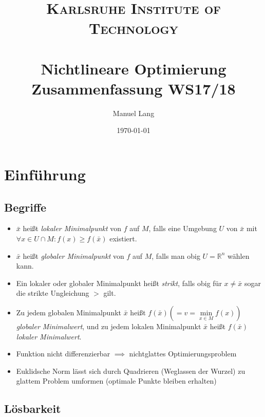 \documentclass[paper=a4, fontsize=11pt]{scrartcl} %
\title{
\normalfont \normalsize
\textsc{Karlsruhe Institute of Technology} \\ [25pt] %
\horrule{0.5pt} \\[0.4cm] %
\huge Nichtlineare Optimierung\\ Zusammenfassung WS17/18 %
\horrule{2pt} \\[0.5cm] %
}
\author{Manuel Lang} %
\date{\normalsize\today} %
\numberwithin{equation}{section} %
\numberwithin{figure}{section} %
\numberwithin{table}{section} %
\begin{document}
\maketitle %

\section{Einführung}

\subsection{Begriffe}

\begin{itemize}
\item $\bar{x}$ heißt \textit{lokaler Minimalpunkt} von $f$ auf $M$, falls eine Umgebung $U$ von $\bar{x}$ mit $\forall x \in U \cap M: f(x) \ge f(\bar{x})$ existiert.
\item $\bar{x}$ heißt \textit{globaler Minimalpunkt} von $f$ auf $M$, falls man obig $U = \mathbb{R}^n$ wählen kann.
\item Ein lokaler oder globaler Minimalpunkt heißt \textit{strikt}, falls obig für $x \neq \bar{x}$ sogar die strikte Ungleichung $>$ gilt.
\item Zu jedem globalen Minimalpunkt $\bar{x}$ heißt $f(\bar{x}) (=v= \min\limits_{x \in M} f(x))$ \textit{globaler Minimalwert}, und zu jedem lokalen Minimalpunkt $\bar{x}$ heißt $f(\bar{x})$ \textit{lokaler Minimalwert}.
\item Funktion nicht differenzierbar $\implies$ nichtglattes Optimierungsproblem
\item Euklidsche Norm lässt sich durch Quadrieren (Weglassen der Wurzel) zu glattem Problem umformen (optimale Punkte bleiben erhalten)
\end{itemize}

\subsection{Lösbarkeit}
\end{document}
